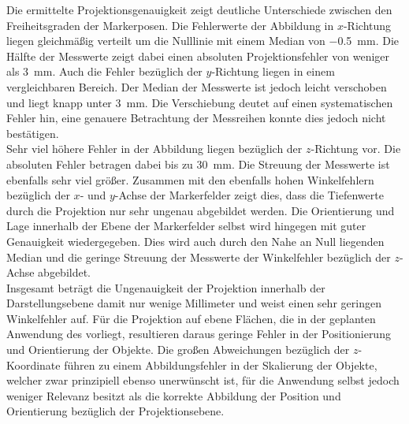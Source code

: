 
%

Die ermittelte Projektionsgenauigkeit zeigt deutliche Unterschiede zwischen den Freiheitsgraden der Markerposen. Die Fehlerwerte der Abbildung in $x$-Richtung liegen gleichmäßig verteilt um die Nulllinie mit einem Median von \SI{-0.5}{\milli\meter}. Die Hälfte der Messwerte zeigt dabei einen absoluten Projektionsfehler von weniger als \SI{3}{\milli\meter}. Auch die Fehler bezüglich der $y$-Richtung liegen in einem vergleichbaren Bereich. Der Median der Messwerte ist jedoch leicht verschoben und liegt knapp unter \SI{3}{\milli\meter}. Die Verschiebung deutet auf einen systematischen Fehler hin, eine genauere Betrachtung der Messreihen konnte dies jedoch nicht bestätigen.\\

Sehr viel höhere Fehler in der Abbildung liegen bezüglich der $z$-Richtung vor. Die absoluten Fehler betragen dabei bis zu \SI{30}{\milli\meter}. Die Streuung der Messwerte ist ebenfalls sehr viel größer. Zusammen mit den ebenfalls hohen Winkelfehlern bezüglich der $x$- und $y$-Achse der Markerfelder zeigt dies, dass die Tiefenwerte durch die Projektion nur sehr ungenau abgebildet werden. Die Orientierung und Lage innerhalb der Ebene der Markerfelder selbst wird hingegen mit guter Genauigkeit wiedergegeben. Dies wird auch durch den Nahe an Null liegenden Median und die geringe Streuung der Messwerte der Winkelfehler bezüglich der $z$-Achse abgebildet.\\

Insgesamt beträgt die Ungenauigkeit der Projektion innerhalb der Darstellungsebene damit nur wenige Millimeter und weist einen sehr geringen Winkelfehler auf. Für die Projektion auf ebene Flächen, die in der geplanten Anwendung des  vorliegt, resultieren daraus geringe Fehler in der Positionierung und Orientierung der Objekte. Die großen Abweichungen bezüglich der $z$-Koordinate führen zu einem Abbildungsfehler in der Skalierung der Objekte, welcher zwar prinzipiell ebenso unerwünscht ist, für die Anwendung selbst jedoch weniger Relevanz besitzt als die korrekte Abbildung der Position und Orientierung bezüglich der Projektionsebene.

\prever{
}

